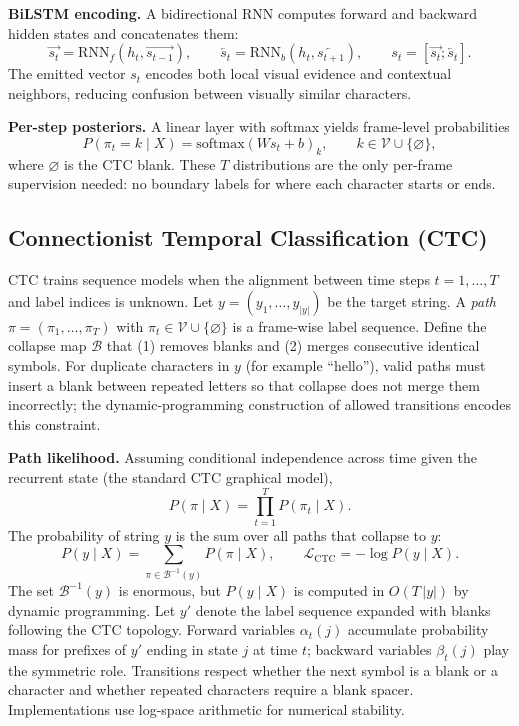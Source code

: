 \documentclass[11pt, a4paper]{article}
\begin{document}
\textbf{BiLSTM encoding.} A bidirectional RNN computes forward and backward hidden states and concatenates them:
\[
\overrightarrow{s_t} = \mathrm{RNN}_f(h_t,\overrightarrow{s_{t-1}}), \qquad
\overleftarrow{s_t} = \mathrm{RNN}_b(h_t,\overleftarrow{s_{t+1}}), \qquad
s_t = [\overrightarrow{s_t};\overleftarrow{s_t}].
\]
The emitted vector $s_t$ encodes both local visual evidence and contextual neighbors, reducing confusion between visually similar characters.

\textbf{Per-step posteriors.} A linear layer with softmax yields frame-level probabilities
\[
P(\pi_t = k \mid X) = \mathrm{softmax}(W s_t + b)_k, \qquad k \in \mathcal{V} \cup \{\varnothing\},
\]
where $\varnothing$ is the CTC blank. These $T$ distributions are the only per-frame supervision needed: no boundary labels for where each character starts or ends.

\subsection{Connectionist Temporal Classification (CTC)}
CTC \cite{graves2006ctc} trains sequence models when the alignment between time steps $t=1,\ldots,T$ and label indices is unknown. Let $y = (y_1,\ldots,y_{|y|})$ be the target string. A \emph{path} $\pi = (\pi_1,\ldots,\pi_T)$ with $\pi_t \in \mathcal{V} \cup \{\varnothing\}$ is a frame-wise label sequence. Define the collapse map $\mathcal{B}$ that (1) removes blanks and (2) merges consecutive identical symbols. For duplicate characters in $y$ (for example ``hello''), valid paths must insert a blank between repeated letters so that collapse does not merge them incorrectly; the dynamic-programming construction of allowed transitions encodes this constraint.

\textbf{Path likelihood.} Assuming conditional independence across time given the recurrent state (the standard CTC graphical model),
\[
P(\pi \mid X) = \prod_{t=1}^{T} P(\pi_t \mid X).
\]
The probability of string $y$ is the sum over all paths that collapse to $y$:
\[
P(y \mid X) = \sum_{\pi \in \mathcal{B}^{-1}(y)} P(\pi \mid X),
\qquad
\mathcal{L}_{\text{CTC}} = -\log P(y \mid X).
\]
The set $\mathcal{B}^{-1}(y)$ is enormous, but $P(y \mid X)$ is computed in $O(T\,|y|)$ by dynamic programming. Let $y'$ denote the label sequence expanded with blanks following the CTC topology. Forward variables $\alpha_t(j)$ accumulate probability mass for prefixes of $y'$ ending in state $j$ at time $t$; backward variables $\beta_t(j)$ play the symmetric role. Transitions respect whether the next symbol is a blank or a character and whether repeated characters require a blank spacer. Implementations use log-space arithmetic for numerical stability.
\end{document}
